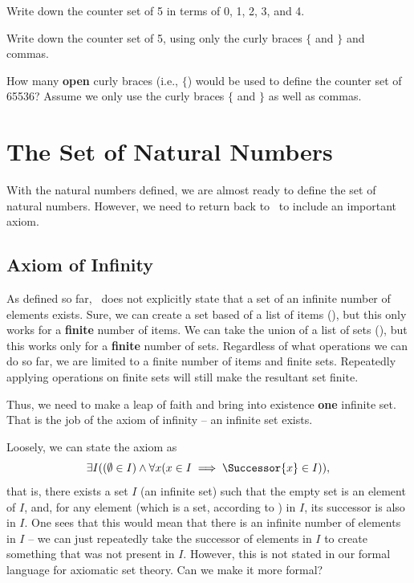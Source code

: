 \begin{exercise}
    \begin{partquestions}{\roman*}
        \item Write down the counter set of 5 in terms of 0, 1, 2, 3, and 4.
        \item Write down the counter set of 5, using only the curly braces $\{$ and $\}$ and commas.
        \item How many \textbf{open} curly braces (i.e., $\{$) would be used to define the counter set of 65536? Assume we only use the curly braces $\{$ and $\}$ as well as commas.
    \end{partquestions}
\end{exercise}

\section{The Set of Natural Numbers}
With the natural numbers defined, we are almost ready to define the set of natural numbers. However, we need to return back to \ZFC~to include an important axiom.

\subsection{Axiom of Infinity}
As defined so far, \ZFC~does not explicitly state that a set of an infinite number of elements exists. Sure, we can create a set based of a list of items (), but this only works for a \textbf{finite} number of items. We can take the union of a list of sets (), but this works only for a \textbf{finite} number of sets. Regardless of what operations we can do so far, we are limited to a finite number of items and finite sets. Repeatedly applying operations on finite sets will still make the resultant set finite.

Thus, we need to make a leap of faith and bring into existence \textbf{one} infinite set. That is the job of the axiom of infinity -- an infinite set exists.

Loosely, we can state the axiom as
\[
    \exists I ((\emptyset \in I) \land \forall x (x \in I \implies \Successor{x} \in I)),
\]
that is, there exists a set $I$ (an infinite set) such that the empty set is an element of $I$, and, for any element (which is a set, according to \ZFC) in $I$, its successor is also in $I$. One sees that this would mean that there is an infinite number of elements in $I$ -- we can just repeatedly take the successor of elements in $I$ to create something that was not present in $I$. However, this is not stated in our formal language for axiomatic set theory. Can we make it more formal?

